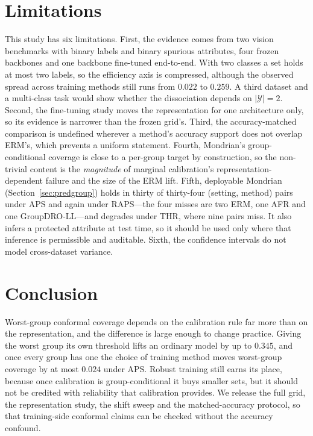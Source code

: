 \documentclass[pdflatex,sn-basic]{sn-jnl}%
\theoremstyle{thmstyleone}%
\begin{document}
\section{Limitations}
\label{sec:limitations}

This study has six limitations. First, the evidence comes from two vision benchmarks with binary
labels and binary spurious attributes, four frozen backbones and one backbone fine-tuned
end-to-end. With two classes a set holds at most two labels, so the efficiency axis is compressed,
although the observed spread across training methods still runs from $0.022$ to $0.259$. A third
dataset and a multi-class task would show whether the dissociation depends on $|\mathcal{Y}|=2$.
Second, the fine-tuning study moves the representation for one architecture only, so its evidence is
narrower than the frozen grid's. Third, the accuracy-matched comparison is undefined wherever a
method's accuracy support does not overlap ERM's, which prevents a uniform statement. Fourth,
Mondrian's group-conditional coverage is close to a per-group target by construction, so the
non-trivial content is the \emph{magnitude} of marginal calibration's representation-dependent
failure and the size of the ERM lift. Fifth, deployable Mondrian (Section~\ref{sec:predgroup}) holds
in thirty of thirty-four (setting, method) pairs under APS and again under RAPS---the four misses
are two ERM, one AFR and one GroupDRO-LL---and degrades under THR, where nine pairs miss. It also infers a protected attribute at test time, so it should be used only where that
inference is permissible and auditable. Sixth, the confidence intervals do not model cross-dataset
variance.

\section{Conclusion}
\label{sec:conclusion}

Worst-group conformal coverage depends on the calibration rule far more than on the
representation, and the difference is large enough to change practice. Giving the worst group its
own threshold lifts an ordinary model by up to $0.345$, and once every group has one the choice of
training method moves worst-group coverage by at most $0.024$ under APS. Robust training still earns its place, because once calibration is
group-conditional it buys smaller sets, but it should not be credited with reliability that
calibration provides. We release the full grid, the representation study, the shift
sweep and the matched-accuracy protocol, so that training-side conformal claims can be
checked without the accuracy confound.
\end{document}
